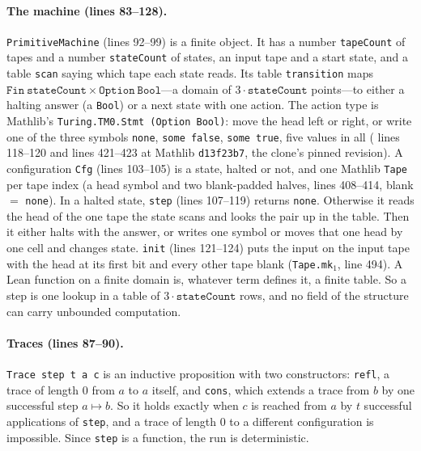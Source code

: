 \paragraph{The machine (lines 83--128).}
\texttt{PrimitiveMachine} (lines 92--99) is a finite object. It has a number
\texttt{tapeCount} of tapes and a number \texttt{stateCount} of states,
an input tape and a start state, and a table \texttt{scan} saying which tape
each state reads. Its table \texttt{transition} maps
\(\mathtt{Fin}\ \mathtt{stateCount} \times \mathtt{Option\ Bool}\)---a
domain of \(3 \cdot \mathtt{stateCount}\) points---to either a halting
answer (a \texttt{Bool}) or a next state with one action. The action type
is Mathlib's \texttt{Turing.TM0.Stmt (Option Bool)}: move the head left or
right, or write one of the three symbols \texttt{none}, \texttt{some
false}, \texttt{some true}, five values in all
(
lines 118--120 and  lines 421--423 at Mathlib
\texttt{d13f23b7}, the clone's pinned revision). A configuration
\texttt{Cfg} (lines 103--105) is a state, halted or not, and one Mathlib
\texttt{Tape} per tape index (a head symbol and two blank-padded halves,
 lines 408--414, blank \(=\) \texttt{none}).
In a halted state, \texttt{step} (lines 107--119) returns \texttt{none}.
Otherwise it reads the head of the one tape the state scans and looks the
pair up in the table. Then it either halts with the answer, or writes one
symbol or moves that one head by one cell and changes state. \texttt{init}
(lines 121--124) puts the input on the input tape with the head at its
first bit and every other tape blank (\texttt{Tape.mk}$_1$,
 line 494). A Lean function on a finite domain is,
whatever term defines it, a finite table. So a step is one lookup in a
table of \(3 \cdot \mathtt{stateCount}\) rows, and no field of the
structure can carry unbounded computation.

\paragraph{Traces (lines 87--90).}
\texttt{Trace step t a c} is an inductive proposition with two
constructors: \texttt{refl}, a trace of length 0 from \(a\) to \(a\)
itself, and \texttt{cons}, which extends a trace from \(b\) by one
successful step \(a \mapsto b\). So it holds exactly when \(c\) is
reached from \(a\) by \(t\) successful applications of \texttt{step}, and
a trace of length 0 to a different configuration is impossible. Since
\texttt{step} is a function, the run is deterministic.

